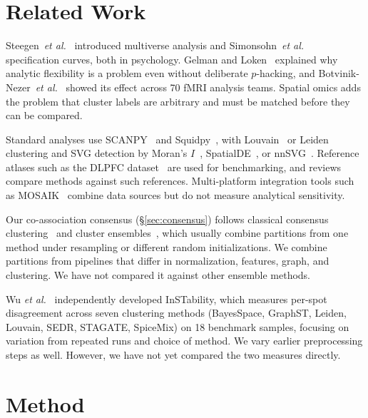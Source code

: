 \documentclass[conference]{IEEEtran}
\begin{document}
\section{Related Work}
\label{sec:related}

Steegen~\emph{et al.}~\cite{steegen2016increasing} introduced multiverse
analysis and Simonsohn~\emph{et al.}~\cite{simonsohn2020specification}
specification curves, both in psychology. Gelman and
Loken~\cite{gelman2013garden} explained why analytic flexibility is a
problem even without deliberate $p$-hacking, and
Botvinik-Nezer~\emph{et al.}~\cite{botvinik2020variability} showed its
effect across 70 fMRI analysis teams. Spatial omics adds the problem that
cluster labels are arbitrary and must be matched before they can be
compared.

Standard analyses use SCANPY~\cite{wolf2018scanpy} and Squidpy~\cite{palla2022squidpy}, with
Louvain~\cite{blondel2008fast} or
Leiden~\cite{traag2019louvain,traag2011narrow} clustering and SVG detection
by Moran's $I$~\cite{moran1950notes},
SpatialDE~\cite{svensson2018spatialde}, or nnSVG~\cite{weber2023nnsvg}.
Reference atlases such as the DLPFC dataset~\cite{maynard2021transcriptome}
are used for benchmarking, and reviews~\cite{luecken2019current} compare
methods against such references. Multi-platform integration tools such as
MOSAIK~\cite{baptista2025mosaik} combine data sources but do not measure
analytical sensitivity.

Our co-association consensus (\S\ref{sec:consensus}) follows classical consensus
clustering~\cite{monti2003consensus} and cluster ensembles~\cite{strehl2002cluster}, which usually combine partitions from
one method under resampling or different random initializations. We
combine partitions from pipelines that differ in normalization, features,
graph, and clustering. We have not compared it against other ensemble
methods. 

Wu \emph{et al.}~\cite{wu2026instability} independently developed InSTability,
which measures per-spot disagreement across seven clustering methods
(BayesSpace, GraphST, Leiden, Louvain, SEDR, STAGATE, SpiceMix) on 18
benchmark samples, focusing on variation from repeated runs and choice of
method. We vary earlier preprocessing steps as well. However, we have not yet compared the two measures directly. 

\section{Method}
\label{sec:method}
\end{document}
